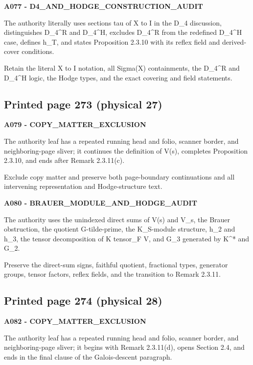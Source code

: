 \documentclass[10pt,a4paper]{article}
\begin{document}
\textbf{A077 - D4\_AND\_HODGE\_CONSTRUCTION\_AUDIT}

The authority literally uses sections tau of X to I in the D\_4 discussion, distinguishes D\_4\^{}R and D\_4\^{}H, excludes D\_4\^{}R from the redefined D\_4\^{}H case, defines h\_T, and states Proposition 2.3.10 with its reflex field and derived-cover conditions.

Retain the literal X to I notation, all Sigma(X) containments, the D\_4\^{}R and D\_4\^{}H logic, the Hodge types, and the exact covering and field statements.

\subsection{Printed page 273 (physical 27)}

\textbf{A079 - COPY\_MATTER\_EXCLUSION}

The authority leaf has a repeated running head and folio, scanner border, and neighboring-page sliver; it continues the definition of V(s), completes Proposition 2.3.10, and ends after Remark 2.3.11(c).

Exclude copy matter and preserve both page-boundary continuations and all intervening representation and Hodge-structure text.

\textbf{A080 - BRAUER\_MODULE\_AND\_HODGE\_AUDIT}

The authority uses the unindexed direct sums of V(s) and V\_s, the Brauer obstruction, the quotient G-tilde-prime, the K\_S-module structure, h\_2 and h\_3, the tensor decomposition of K tensor\_F V, and G\_3 generated by K\^{}* and G\_2.

Preserve the direct-sum signs, faithful quotient, fractional types, generator groups, tensor factors, reflex fields, and the transition to Remark 2.3.11.

\subsection{Printed page 274 (physical 28)}

\textbf{A082 - COPY\_MATTER\_EXCLUSION}

The authority leaf has a repeated running head and folio, scanner border, and neighboring-page sliver; it begins with Remark 2.3.11(d), opens Section 2.4, and ends in the final clause of the Galois-descent paragraph.
\end{document}
